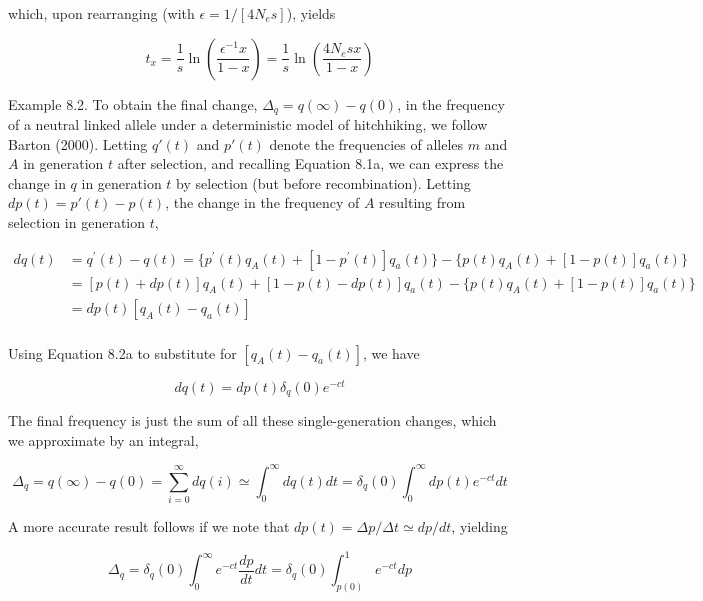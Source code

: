 \documentclass{article}
\begin{document}
which, upon rearranging (with  $ \epsilon = 1/[4N_{e}s] $), yields

\begin{equation}
t_{x}=\frac{1}{s}\ln\left(\frac{\epsilon^{-1}x}{1-x}\right)=\frac{1}{s}\ln\left(\frac{4N_{e}s x}{1-x}\right)
\tag{8.4e}
\label{eq:8_4e}
\end{equation}

Example 8.2. To obtain the final change,  $ \Delta_q = q(\infty) - q(0) $, in the frequency of a neutral linked allele under a deterministic model of hitchhiking, we follow Barton (2000). Letting  $ q'(t) $ and  $ p'(t) $ denote the frequencies of alleles  $ m $ and  $ A $ in generation  $ t $ after selection, and recalling Equation 8.1a, we can express the change in  $ q $ in generation  $ t $ by selection (but before recombination). Letting  $ dp(t) = p'(t) - p(t) $, the change in the frequency of  $ A $ resulting from selection in generation  $ t $,

\begin{equation}
\begin{aligned}dq(t)&=q^{\prime}(t)-q(t)=\{p^{\prime}(t)q_{A}(t)+[1-p^{\prime}(t)]q_{a}(t)\}-\{p(t)q_{A}(t)+[1-p(t)]q_{a}(t)\}\\&=[p(t)+dp(t)]q_{A}(t)+[1-p(t)-dp(t)]q_{a}(t)-\{p(t)q_{A}(t)+[1-p(t)]q_{a}(t)\}\\&=dp(t)\left[q_{A}(t)-q_{a}(t)\right]\\ \end{aligned}
\end{equation}

Using Equation 8.2a to substitute for  $ [q_{A}(t) - q_{a}(t)] $, we have

\begin{equation}
d q(t)=d p(t)\delta_{q}(0)e^{-c t}
\end{equation}

The final frequency is just the sum of all these single-generation changes, which we approximate by an integral,

\begin{equation}
\Delta_{q}=q(\infty)-q(0)=\sum_{i=0}^{\infty}d q(i)\simeq\int_{0}^{\infty}d q(t)d t=\delta_{q}(0)\int_{0}^{\infty}d p(t)e^{-c t}d t
\end{equation}

A more accurate result follows if we note that  $ dp(t) = \Delta p / \Delta t \simeq dp / dt $, yielding

\begin{equation}
\Delta_{q}=\delta_{q}(0)\int_{0}^{\infty}e^{-c t}\frac{d p}{d t}d t=\delta_{q}(0)\int_{p(0)}^{1}e^{-c t}d p
\end{equation}
\end{document}
